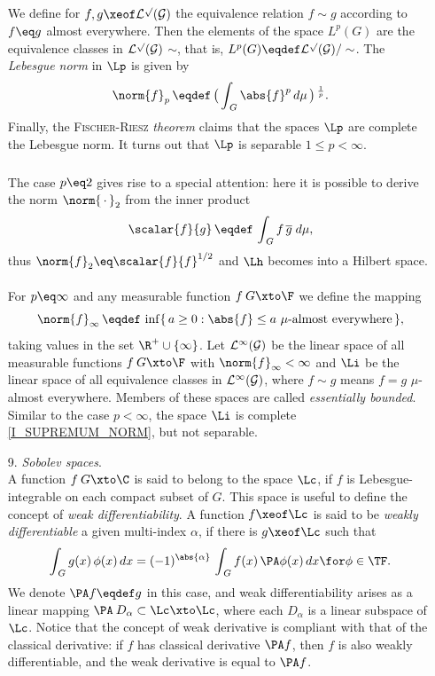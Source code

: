 \documentclass[11pt,twoside]{article}
\def\G{G}
\begin{document}
\begin{itemize}[leftmargin=12pt,itemsep=5pt]
\subparagraph{}
We define for $f,g \xeof \cal{L}^p(\G)$ the equivalence relation
$f \sim g$ according to $f \eq g$ almost everywhere.
Then the elements of the space $L^p(\G)$
are the equivalence classes in $\cal{L}^p(\G)$ {\wrt} $\sim$,
that is,
$L^p(\G) \eqdef \cal{L}^p(\G) / \sim$.
The \textit{Lebesgue norm} in $\Lp$ is given by
\[
\norm{f}_p
\, \eqdef \,
\big( \int_{\,\G} \abs{f} ^p \, d\mu \,\big) \, ^{\frac{1}{p}}.
\]
Finally,
the \textsc{Fischer-Riesz} \textit{theorem} claims
that the spaces $\Lp$ are complete {\wrt} the Lebesgue norm.
It turns out that $\Lp$ is separable \iff $1 \leq p < \infty$.

\subparagraph{} %
The case $p \eq 2$ gives rise to a special attention:
here it is possible to derive the norm $\norm{\,\cdot\,}_2$
from the inner product
\[
\scalar{f}{g} \, \eqdef \, \int_{\,\G} f \, \overline{g} \; d\mu,
\]
thus $\norm{f}_2 \eq \scalar{f}{f} ^{1/2}$
and $\Lh$ becomes into a Hilbert space.

\paragraph{}
For $p \eq \infty$ and any measurable function $f\:\G \xto \F$
we define the mapping
\begin{equation}\label{I_SUPREMUM_NORM}
\norm{f}_{\infty} \, \eqdef \, \inf
\{\,a \geq 0: \abs{f} \leq a \,\, \mu \mbox{-almost everywhere}\,\},
\end{equation}
taking values in the set $\R^+ \cup \{\infty\}$.
Let $\cal{L}^{\infty}(\G)$ be the linear space
of all measurable functions $f\:\G \xto \F$
with $\norm{f}_{\infty} < \infty$
and $\Li$ be the linear space of all equivalence classes
in $\cal{L}^{\infty}(\G)$,
where $f \sim g$ means $f=g$ $\mu$-almost everywhere.
Members of these spaces are called \textit{essentially bounded}.
Similar to the case $p < \infty$,
the space $\Li$ is complete {\wrt} \eqref{I_SUPREMUM_NORM},
but not separable.

\item[9.] \textit{Sobolev spaces}.\\
A function $f\:\G \xto \C$ is said to belong to the space $\Lc$,
if $f$ is Lebesgue-integrable on each compact subset of $\G$.
This space is useful to define the concept of \textit{weak differentiability}.
A function $f \xeof \Lc$ is said to be \textit{weakly differentiable}
{\wrt} a given multi-index $\alpha$,
if there is $g \xeof \Lc$
such that 
\[
\int_{\,\G} g(x) \, \phi(x) \, dx
=
(-1)^{ \abs{\alpha} } \,
\int_{\,\G} f(x) \, \PA \phi(x) \, dx
\for \phi \in \TF.
\]
We denote $\PA f \eqdef g$ in this case,
and weak differentiability arises as a linear mapping
$\PA\:D_{\alpha} \subset \Lc \xto \Lc$,
where each $D_{\alpha}$ is a linear subspace of $\Lc$.
Notice that
the concept of weak derivative is compliant
with that of the classical derivative:
if $f$ has classical derivative $\PA f$,
then $f$ is also weakly differentiable,
and the weak derivative is equal to $\PA f$.


\end{itemize}
\end{document}

